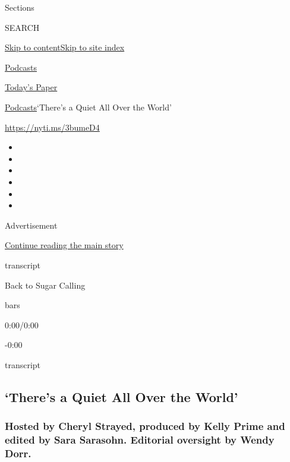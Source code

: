 Sections

SEARCH

\protect\hyperlink{site-content}{Skip to
content}\protect\hyperlink{site-index}{Skip to site index}

\href{https://www.nytimes3xbfgragh.onion/spotlight/podcasts}{Podcasts}

\href{https://myaccount.nytimes3xbfgragh.onion/auth/login?response_type=cookie\&client_id=vi}{}

\href{https://www.nytimes3xbfgragh.onion/section/todayspaper}{Today's
Paper}

\href{/spotlight/podcasts}{Podcasts}\textbar{}`There's a Quiet All Over
the World'

\url{https://nyti.ms/3bumeD4}

\begin{itemize}
\item
\item
\item
\item
\item
\item
\end{itemize}

Advertisement

\protect\hyperlink{after-top}{Continue reading the main story}

transcript

Back to Sugar Calling

bars

0:00/0:00

-0:00

transcript

\hypertarget{theres-a-quiet-all-over-the-world}{%
\subsection{`There's a Quiet All Over the
World'}\label{theres-a-quiet-all-over-the-world}}

\hypertarget{hosted-by-cheryl-strayed-produced-by-kelly-prime-and-edited-by-sara-sarasohn-editorial-oversight-by-wendy-dorr}{%
\subsubsection{Hosted by Cheryl Strayed, produced by Kelly Prime and
edited by Sara Sarasohn. Editorial oversight by Wendy
Dorr.}\label{hosted-by-cheryl-strayed-produced-by-kelly-prime-and-edited-by-sara-sarasohn-editorial-oversight-by-wendy-dorr}}


